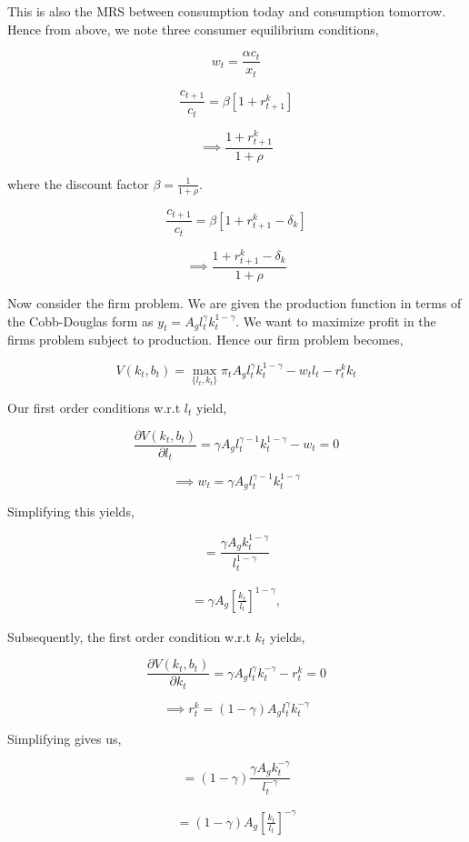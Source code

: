 \documentclass[
  11pt,
  justified]{article}
\begin{document}
This is also the MRS between consumption today and consumption tomorrow.
Hence from above, we note three consumer equilibrium conditions,

\[
w_t = \frac{\alpha c_t}{x_t}
\]

\[
\frac{c_{t+1}}{c_t}  = \beta [1 + r_{t+1}^k] 
\]

\[
\implies \frac{1+r_{t+1}^k}{1+\rho}
\]

where the discount factor \(\beta = \frac{1}{1+\rho}\).

\[
\frac{c_{t+1}}{c_t}=\beta[1+r_{t+1}^k-\delta_k]  
\]

\[
\implies \frac{1+r_{t+1}^k-\delta_k}{1+\rho}
\]

Now consider the firm problem. We are given the production function in
terms of the Cobb-Douglas form as
\(y_t = A_g l_t^\gamma k_t^{1-\gamma}\). We want to maximize profit in
the firms problem subject to production. Hence our firm problem becomes,

\[
V(k_t, b_t) =  \max_{\{l_t, k_{t}\}} \pi_t  A_g l_t^\gamma k_t^{1-\gamma} - w_t l_t - r_t^k k_t  
\]

Our first order conditions w.r.t \(l_t\) yield,

\[
\frac{\partial V(k_t, b_t)}{\partial l_t} = \gamma A_g l_t^{\gamma - 1} k_t^{1-\gamma} - w_t = 0 
\]

\[
\implies w_t = \gamma A_g l_t^{\gamma - 1} k_t^{1-\gamma}
\]

Simplifying this yields,

\[
= \frac{\gamma A_g k_t^{1-\gamma}} {l_t^{1-\gamma}}
\]

\begin{align}
= \gamma A_g [\frac{k_t}{l_t}]^{1-\gamma}, \tag{real wage} \label{eq:real_wage}
\end{align}

Subsequently, the first order condition w.r.t \(k_t\) yields,

\[
\frac{\partial V(k_t, b_t)}{\partial k_t} = \gamma A_g l_t^{\gamma} k_t^{-\gamma} - r_t^k = 0 
\]

\[
\implies r_t^k = (1-\gamma) A_g l_t^{\gamma} k_t^{-\gamma} 
\]

Simplifying gives us,

\[
= (1-\gamma) \frac{\gamma A_g k_t^{- \gamma}} {l_t^{- \gamma}}
\]

\begin{align}
= (1-\gamma) A_g [\frac{k_t}{l_t}]^{- \gamma}\tag{real interest rate} \label{eq:real_interest}
\end{align}
\end{document}
